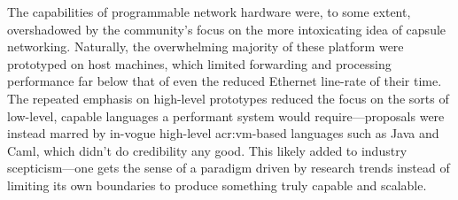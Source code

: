 The capabilities of programmable network hardware were, to some extent, overshadowed by the community's focus on the more intoxicating idea of capsule networking.
Naturally, the overwhelming majority of these platform were prototyped on host machines, which limited forwarding and processing performance far below that of even the reduced Ethernet line-rate of their time.
The repeated emphasis on high-level prototypes reduced the focus on the sorts of low-level, capable languages a performant system would require---proposals were instead marred by in-vogue high-level \gls{acr:vm}-based languages such as Java and Caml, which didn't do credibility any good.
This likely added to industry scepticism---one gets the sense of a paradigm driven by research trends instead of limiting its own boundaries to produce something truly capable and scalable.

